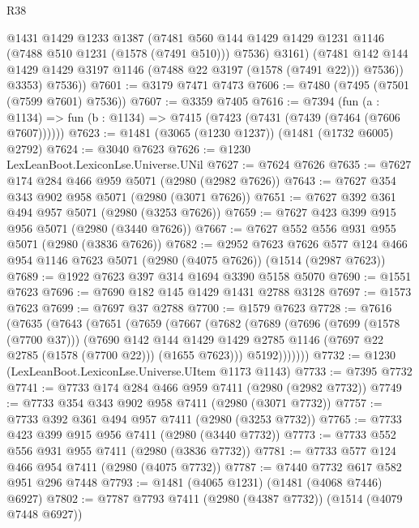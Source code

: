 \begin{lexlean}{R38}
\begin{coremodule}
              @1431
              @1429
              @1233
              @1387
              (@7481
                @560
                @144
                @1429
                @1429
                @1231
                @1146
                (@7488 @510 @1231 (@1578 (@7491 @510)))
                @7536)
              @3161)
            (@7481 @142 @144 @1429 @1429 @3197 @1146 (@7488 @22 @3197 (@1578 (@7491 @22))) @7536))
          @3353)
        @7536))
@7601 := @3179 @7471 @7473
@7606 := @7480 (@7495 (@7501 (@7599 @7601) @7536))
@7607 := @3359 @7405
@7616 := @7394
    (fun (a : @1134) => fun (b : @1134) => @7415 (@7423 (@7431 (@7439 (@7464 (@7606 @7607))))))
@7623 := @1481 (@3065 (@1230 @1237)) (@1481 (@1732 @6005) @2792)
@7624 := @3040 @7623
@7626 := @1230 LexLeanBoot.LexiconLse.Universe.UNil
@7627 := @7624 @7626
@7635 := @7627 @174 @284 @466 @959 @5071 (@2980 (@2982 @7626))
@7643 := @7627 @354 @343 @902 @958 @5071 (@2980 (@3071 @7626))
@7651 := @7627 @392 @361 @494 @957 @5071 (@2980 (@3253 @7626))
@7659 := @7627 @423 @399 @915 @956 @5071 (@2980 (@3440 @7626))
@7667 := @7627 @552 @556 @931 @955 @5071 (@2980 (@3836 @7626))
@7682 := @2952
    @7623
    @7626
    @577
    @124
    @466
    @954
    @1146
    @7623
    @5071
    (@2980 (@4075 @7626))
    (@1514 (@2987 @7623))
@7689 := @1922 @7623 @397 @314 @1694 @3390 @5158 @5070
@7690 := @1551 @7623
@7696 := @7690 @182 @145 @1429 @1431 @2788 @3128
@7697 := @1573 @7623
@7699 := @7697 @37 @2788
@7700 := @1579 @7623
@7728 := @7616
    (@7635
      (@7643
        (@7651
          (@7659
            (@7667
              (@7682
                (@7689
                  (@7696
                    (@7699 (@1578 (@7700 @37)))
                    (@7690
                      @142
                      @144
                      @1429
                      @1429
                      @2785
                      @1146
                      (@7697 @22 @2785 (@1578 (@7700 @22)))
                      (@1655 @7623)))
                  @5192)))))))
@7732 := @1230 (LexLeanBoot.LexiconLse.Universe.UItem @1173 @1143)
@7733 := @7395 @7732
@7741 := @7733 @174 @284 @466 @959 @7411 (@2980 (@2982 @7732))
@7749 := @7733 @354 @343 @902 @958 @7411 (@2980 (@3071 @7732))
@7757 := @7733 @392 @361 @494 @957 @7411 (@2980 (@3253 @7732))
@7765 := @7733 @423 @399 @915 @956 @7411 (@2980 (@3440 @7732))
@7773 := @7733 @552 @556 @931 @955 @7411 (@2980 (@3836 @7732))
@7781 := @7733 @577 @124 @466 @954 @7411 (@2980 (@4075 @7732))
@7787 := @7440 @7732 @617 @582 @951 @296 @7448
@7793 := @1481 (@4065 @1231) (@1481 (@4068 @7446) @6927)
@7802 := @7787 @7793 @7411 (@2980 (@4387 @7732)) (@1514 (@4079 @7448 @6927))

\end{coremodule}
\end{lexlean}

